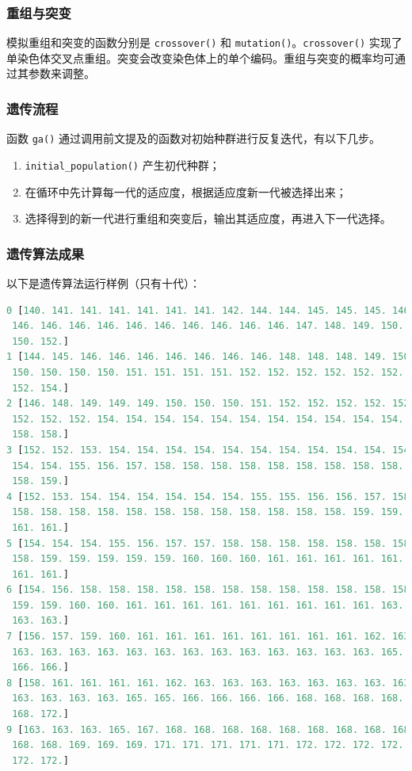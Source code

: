 \documentclass{cumcmthesis}
\begin{document}
	\subsubsection{重组与突变}

	模拟重组和突变的函数分别是 \texttt{crossover()} 和 \texttt{mutation()}。\texttt{crossover()} 实现了单染色体交叉点重组。突变会改变染色体上的单个编码。重组与突变的概率均可通过其参数来调整。

	\subsubsection{遗传流程}

	函数 \texttt{ga()} 通过调用前文提及的函数对初始种群进行反复迭代，有以下几步。
	\begin{enumerate}
		\item \texttt{initial\_population()} 产生初代种群；
		\item 在循环中先计算每一代的适应度，根据适应度新一代被选择出来；
		\item 选择得到的新一代进行重组和突变后，输出其适应度，再进入下一代选择。
	\end{enumerate}

	\subsubsection{遗传算法成果}

	以下是遗传算法运行样例（只有十代）：
	
	\begin{lstlisting}[language=python]
0 [140. 141. 141. 141. 141. 141. 141. 142. 144. 144. 145. 145. 145. 146.
 146. 146. 146. 146. 146. 146. 146. 146. 146. 146. 147. 148. 149. 150.
 150. 152.]
1 [144. 145. 146. 146. 146. 146. 146. 146. 146. 148. 148. 148. 149. 150.
 150. 150. 150. 150. 151. 151. 151. 151. 152. 152. 152. 152. 152. 152.
 152. 154.]
2 [146. 148. 149. 149. 149. 150. 150. 150. 151. 152. 152. 152. 152. 152.
 152. 152. 152. 154. 154. 154. 154. 154. 154. 154. 154. 154. 154. 154.
 158. 158.]
3 [152. 152. 153. 154. 154. 154. 154. 154. 154. 154. 154. 154. 154. 154.
 154. 154. 155. 156. 157. 158. 158. 158. 158. 158. 158. 158. 158. 158.
 158. 159.]
4 [152. 153. 154. 154. 154. 154. 154. 154. 155. 155. 156. 156. 157. 158.
 158. 158. 158. 158. 158. 158. 158. 158. 158. 158. 158. 158. 159. 159.
 161. 161.]
5 [154. 154. 154. 155. 156. 157. 157. 158. 158. 158. 158. 158. 158. 158.
 158. 159. 159. 159. 159. 159. 160. 160. 160. 161. 161. 161. 161. 161.
 161. 161.]
6 [154. 156. 158. 158. 158. 158. 158. 158. 158. 158. 158. 158. 158. 158.
 159. 159. 160. 160. 161. 161. 161. 161. 161. 161. 161. 161. 161. 163.
 163. 163.]
7 [156. 157. 159. 160. 161. 161. 161. 161. 161. 161. 161. 161. 162. 163.
 163. 163. 163. 163. 163. 163. 163. 163. 163. 163. 163. 163. 163. 165.
 166. 166.]
8 [158. 161. 161. 161. 161. 162. 163. 163. 163. 163. 163. 163. 163. 163.
 163. 163. 163. 163. 165. 165. 166. 166. 166. 166. 168. 168. 168. 168.
 168. 172.]
9 [163. 163. 163. 165. 167. 168. 168. 168. 168. 168. 168. 168. 168. 168.
 168. 168. 169. 169. 169. 171. 171. 171. 171. 171. 172. 172. 172. 172.
 172. 172.]
	\end{lstlisting}
\end{document}
